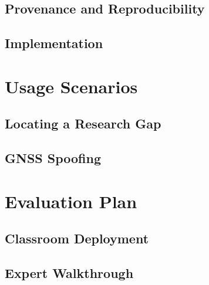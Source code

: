 \documentclass[10pt,a4paper]{article}
\newif\ifshowguides
\newcommand{\guide}[1]{%
  \ifshowguides
    {\par\smallskip\footnotesize\color{guidecol}%
     \textbf{[guide]}~#1\par\smallskip}%
  \fi}
\begin{document}
\subsection{Provenance and Reproducibility}

\guide{State the snapshot-not-fetch policy here: external sources are
version-pinned into the repository with a retrieval date rather than
queried live, so a figure in this paper can be regenerated years from
now. Name the snapshot commit. This is the subsection that earns the
word ``living'' used in the Summary --- without it, the claim is
decoration.}

\subsection{Implementation}

\section{Usage Scenarios}

\guide{Two scenarios is the right number at this length; three if you cut
elsewhere. Each should be a task a real analyst has, not a feature tour,
and each should end with an answer the reader could not have obtained
from the sources cited in Related Work.}

\subsection{Locating a Research Gap}

\subsection{GNSS Spoofing}

\section{Evaluation Plan}

\subsection{Classroom Deployment}

\subsection{Expert Walkthrough}
\end{document}
